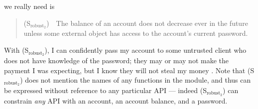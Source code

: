 { %
  we really need is
 \begin{quote}
(S$_{\text{robust}_2}$)\  \ The balance of an account does not decrease ever in the future unless some external 
object has access to the account's current password.
\end{quote}
With (S$_{\text{robust}_2}$), I can confidently pass my account to some untrusted client who
  does not have
 knowledge of the password; they may or may not make the payment I was expecting, but I
 know they will not  steal my money \cite{ooToSecurity,miller-esop2013}.
 Note that (S$_{\text{robust}_2}$)  does not mention
 the names of any functions in the module, and 
 thus can be expressed without reference to any particular API ---
 indeed (S$_{\text{robust}_2}$) can constrain \emph{any} API with an account, an account
 balance, and a password.


 
 

 

}
